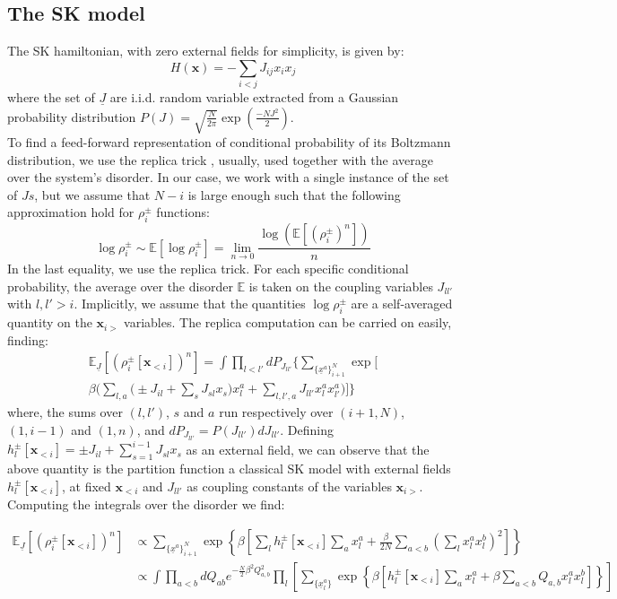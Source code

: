 \documentclass[aps,physrev,10pt,floatfix,reprint]{revtex4-2}
\begin{document}
\subsection{The SK model}
The SK hamiltonian, with zero external fields for simplicity, is given by:
\begin{equation}
H\left(\mathbf{x}\right)=-\sum_{i<j}J_{ij}x_{i}x_{j}
\end{equation}
where the set of $\underline{J}$ are i.i.d. random variable extracted from a Gaussian probability distribution $P(J)=\sqrt{\frac{N}{2\pi}}\exp\left(\frac{-NJ^2}{2} \right)$. \\
To find a feed-forward representation of conditional probability of its Boltzmann distribution, we use the replica trick \cite{10.1142/0271}, usually, used together with the average over the system's disorder. In our case, we work with a single instance of the set of $Js$, but we assume that $N-i$ is large enough such that the following approximation hold for $\rho_i^{\pm}$ functions: 
\[
\log\rho_i^{\pm} \sim \mathbb{E}\left[  \log\rho_i^{\pm} \right] = \lim_{n\rightarrow 0} \frac{  \log(\mathbb{E}\left[(\rho_i^{\pm})^n \right])}{n}
\]
In the last equality, we use the replica trick. 
For each specific conditional probability, the average over the disorder $\mathbb{E}$ is taken on the coupling variables $J_{ll'}$ with $l,l'>i$. Implicitly, we assume that the quantities $\log\rho_i^{\pm}$ are a self-averaged quantity on the $\mathbf{x}_{i>}$ variables.
 The replica computation can be carried on easily, finding:
\begin{multline}
\mathbb{E}_{\underline{J}}\left[(\rho_i^{\pm}[\mathbf{x}_{<i}])^n \right]  = 
\int \prod_{l<l'} dP_{J_{ll'}} \bigg\{ 
\sum_{\{\underline{x}^{a}\}_{i+1}^N} \exp\bigg[\\ \beta \bigg( 
\sum_{l,a}\bigg( \pm J_{il}  
+ \sum_{s} J_{sl} x_s \bigg) x_l^{a} + 
\sum_{l,l', a} J_{ll'} x_l^{a} x_{l'}^{a}
\bigg)  \bigg] 
\bigg\}
\end{multline}
where, the sums over $(l,l')$, $s$ and $a$ run respectively over $(i+1,N)$, $(1,i-1)$ and $(1,n)$, and $dP_{J_{ll'}}=P(J_{ll'})dJ_{ll'}$. Defining $h_l^{\pm}[\mathbf{x}_{<i}] =\pm J_{il} + \sum_{s=1}^{i-1} J_{sl} x_s$ as an external field, we can observe that the above quantity is the partition function a classical SK model with external fields $h_l^{\pm}[\mathbf{x}_{<i}]$, at fixed $\mathbf{x}_{<i}$ and $J_{ll'}$ as coupling constants of the variables $\mathbf{x}_{i>}$.  
Computing the integrals over the disorder we find: 
\begin{widetext}
\begin{align}
\mathbb{E}_{\underline{J}}\left[(\rho_i^{\pm}[\mathbf{x}_{<i}])^n \right]
& \propto  
\sum_{\{\underline{x}^{a}\}_{i+1}^N} 
\exp\left\{\beta \left[
\sum_{l} h_l^{\pm}[\mathbf{x}_{<i}] \sum_{a} x_l^{a} +\frac{\beta}{2N} \sum_{a<b} \left( \sum_{l}  x_l^{a} x_l^{b} \right)^2 \right]  \right\}\\
& \propto  \int \prod_{a<b} dQ_{ab} e^{-\frac{N}{2}\beta^2Q_{a,b}^2}
\prod_{l} \left[
\sum_{\{\underline{x}^{a}_l\}} 
\exp\left\{\beta \left[
h_l^{\pm}[\mathbf{x}_{<i}] \sum_{a} x_l^{a} +\beta \sum_{a<b} Q_{a,b}  x_l^{a} x_l^{b} \right]  \right\}
\right]
\end{align}
\end{widetext}
\end{document}
